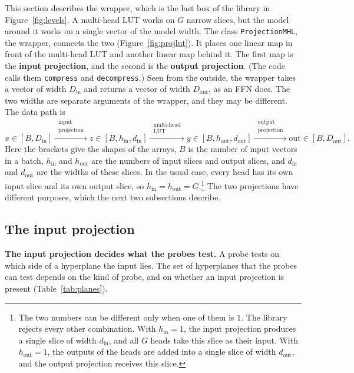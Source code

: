 \documentclass[11pt]{article}
\DeclareRobustCommand{\code}[1]{{\renewcommand{\_}{\textunderscore\allowbreak}\texttt{#1}}}
\newcommand{\term}[1]{\textbf{#1}}
\begin{document}
This section describes the wrapper, which is the last box of the library in Figure~\ref{fig:levels}. A
multi-head LUT works on $G$ narrow slices, but the model around it works on a single vector of the model
width. The class \code{ProjectionMHL}, the wrapper, connects the
two (Figure~\ref{fig:projlut}). It places one linear map in front of the multi-head LUT and another
linear map behind it. The first map is the \term{input projection}, and the second is the \term{output
projection}. (The code calls them \code{compress} and \code{decompress}.) Seen from the outside, the
wrapper takes a vector of width $D_\text{in}$ and returns a vector of width $D_\text{out}$, as an FFN
does. The two widths are separate arguments of the wrapper, and they may be different. The data path is
\[
  x\in[B,D_\text{in}]\xrightarrow{\ \substack{\text{input}\\\text{projection}}\ } z\in[B,h_\text{in},d_\text{in}]
  \xrightarrow{\ \substack{\text{multi-head}\\\text{LUT}}\ } y\in[B,h_\text{out},d_\text{out}]
  \xrightarrow{\ \substack{\text{output}\\\text{projection}}\ } \text{out}\in[B,D_\text{out}].
\]
Here the brackets give the shapes of the arrays, $B$ is the number of input vectors in a batch,
$h_\text{in}$ and $h_\text{out}$ are the numbers of input slices and output slices, and $d_\text{in}$ and
$d_\text{out}$ are the widths of these slices. In the usual case, every head has its own input slice and
its own output slice, so $h_\text{in}=h_\text{out}=G$.\footnote{The two numbers can be different only
when one of them is $1$. The library rejects every other combination. With $h_\text{in}=1$, the input
projection produces a single slice of width $d_\text{in}$, and all $G$ heads take this slice as their
input. With $h_\text{out}=1$, the outputs of the heads are added into a single slice of width
$d_\text{out}$, and the output projection receives this slice.} The two projections have different
purposes, which the next two subsections describe.

\subsection{The input projection}

\textbf{The input projection decides what the probes test.} A probe tests on which side of a hyperplane
the input lies. The set of hyperplanes that the probes can test depends on the kind of probe, and on
whether an input projection is present (Table~\ref{tab:planes}).
\end{document}
